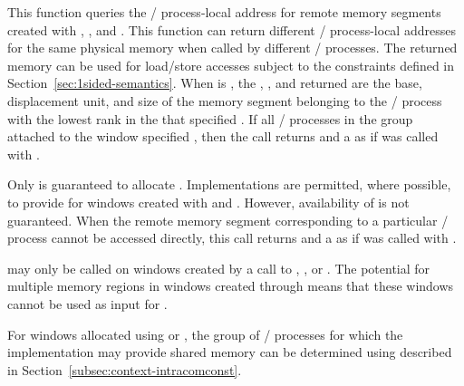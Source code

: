 This function queries the \mpi/ process-local address for remote memory segments
created with , ,
and . This function can return different \mpi/ process-local addresses
for the same physical memory when called by different \mpi/ processes. The returned memory can be used for
load/store accesses subject to the constraints defined in Section~\ref{sec:1sided-semantics}.
When  is , the , , and 
returned are the base, displacement unit, and size of the memory segment belonging to the \mpi/ process with the lowest
rank in the  that specified . If all \mpi/ processes in the group
attached to the window specified , then the call returns 
and a  as if  was called with .

Only  is guaranteed to allocate .
Implementations are permitted, where possible, to provide  for windows created with
 and . However,
availability of  is not guaranteed.
When the remote memory segment corresponding to a particular \MPI/ process cannot be accessed directly,
this call returns  and a  as if 
was called with .

\begin{rationale}
 may only be called on windows created by a call to
, ,
or . The potential for multiple memory regions in windows
created through  means that these windows
cannot be used as input for .
\end{rationale}

\begin{users}
For windows allocated using 
or , the group of \MPI/ processes for which the implementation may provide shared memory can be determined using  described in Section~\ref{subsec:context-intracomconst}.
\end{users}
 

